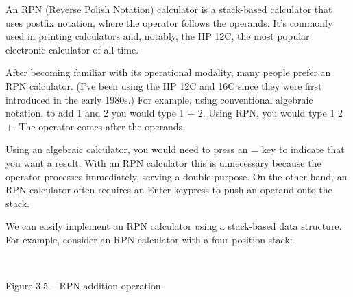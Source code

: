 
An RPN (Reverse Polish Notation) calculator is a stack-based calculator that uses postfix notation, where the operator follows the operands. It's commonly used in printing calculators and, notably, the HP 12C, the most popular electronic calculator of all time.

After becoming familiar with its operational modality, many people prefer an RPN calculator. (I've been using the HP 12C and 16C since they were first introduced in the early 1980s.) For example, using conventional algebraic notation, to add 1 and 2 you would type 1 + 2. Using RPN, you would type 1 2 +. The operator comes after the operands.

Using an algebraic calculator, you would need to press an = key to indicate that you want a result. With an RPN calculator this is unnecessary because the operator processes immediately, serving a double purpose. On the other hand, an RPN calculator often requires an Enter keypress to push an operand onto the stack.

We can easily implement an RPN calculator using a stack-based data structure.
For example, consider an RPN calculator with a four-position stack:

\hspace*{\fill} \\ %
\begin{center}
	
Figure 3.5 – RPN addition operation
\end{center}

